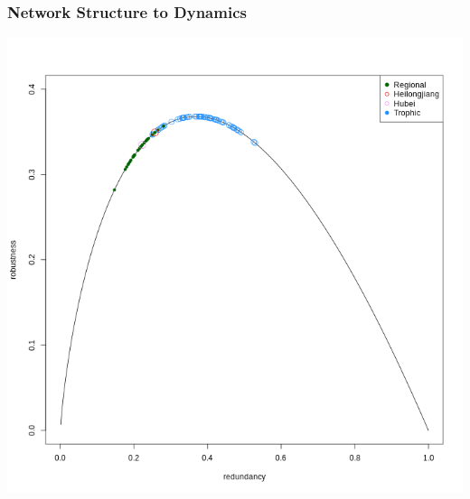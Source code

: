 \documentclass[aspectratio=169]{beamer}
\begin{document}
\begin{frame}
     \frametitle{Network Structure to Dynamics}
     \begin{center}
        \includegraphics[width=0.45\paperwidth]{images/for-rob-red.png}     
     \end{center}
\end{frame}




\end{document}
